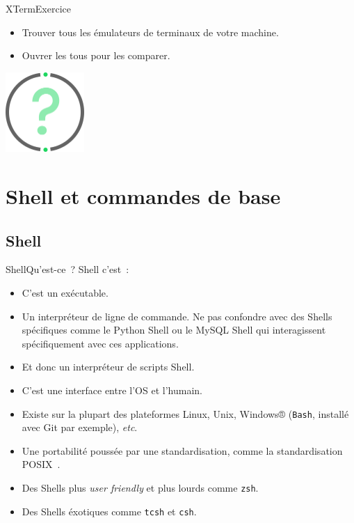 \documentclass{beamer}
\begin{document}
    \begin{frame}{XTerm}{Exercice \execcounterdispinc}
        \begin{itemize}
            \item Trouver tous les émulateurs de terminaux de votre machine.
            \item Ouvrer les tous pour les comparer.
        \end{itemize}
        \bigbreak
        \centering
        \includegraphics[width=3cm]{image/question-mark}
    \end{frame}


    \section{Shell et commandes de base}\label{sec:shell-and-command}

    \subsection{Shell}\label{subsec:shell}

    \begin{frame}{Shell}{Qu'est-ce~?}
        Shell c'est~:
        \begin{itemize}
            \item C'est un exécutable.
            \item Un interpréteur de ligne de commande.
            Ne pas confondre avec des Shells spécifiques comme le Python Shell ou le MySQL Shell qui interagissent spécifiquement avec ces applications.
            \item Et donc un interpréteur de scripts Shell.
            \item C'est une interface entre l'OS et l'humain.
            \item Existe sur la plupart des plateformes Linux, Unix, Windows® (\lstinline{Bash}, installé avec Git par exemple), \textit{etc}.
            \item Une portabilité poussée par une standardisation, comme la standardisation POSIX~.
            \item Des Shells plus \textit{user friendly} et plus lourds comme \lstinline{zsh}.
            \item Des Shells éxotiques comme \lstinline{tcsh} et \lstinline{csh}.
        \end{itemize}
    \end{frame}
\end{document}
